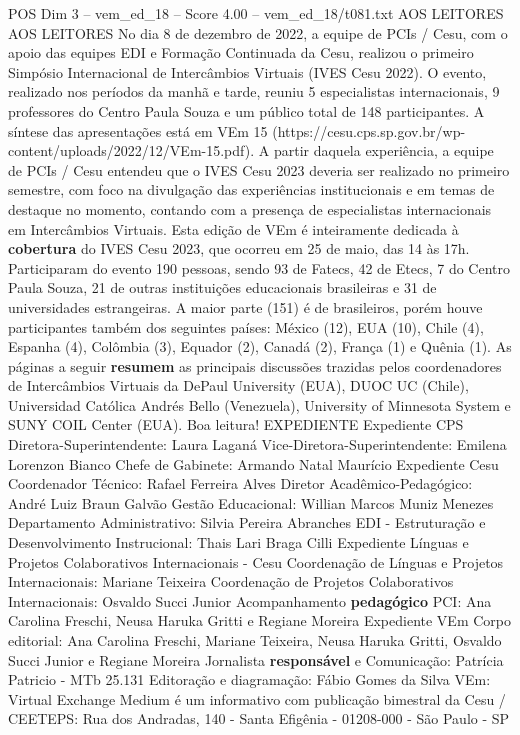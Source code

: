 \begin{textsample}{POS Dim 3 – vem\_ed\_18 – Score 4.00 – vem\_ed\_18/t081.txt}  \label{ex:f3_pos_134}
AOS LEITORES AOS LEITORES No dia 8 de dezembro de 2022, a equipe de PCIs / Cesu, com o apoio das equipes EDI e Formação Continuada da Cesu, realizou o primeiro Simpósio Internacional de Intercâmbios Virtuais (IVES Cesu 2022).
O evento, realizado nos períodos da manhã e tarde, reuniu 5 especialistas internacionais, 9 professores do Centro Paula Souza e um público total de 148 participantes.
A síntese das apresentações está em VEm 15 (https://cesu.cps.sp.gov.br/wp-content/uploads/2022/12/VEm-15.pdf).
A partir daquela experiência, a equipe de PCIs / Cesu entendeu que o IVES Cesu 2023 deveria ser realizado no primeiro semestre, com foco na divulgação das experiências institucionais e em temas de destaque no momento, contando com a presença de especialistas internacionais em Intercâmbios Virtuais.
Esta edição de VEm é inteiramente dedicada à \textbf{cobertura} do IVES Cesu 2023, que ocorreu em 25 de maio, das 14 às 17h.
Participaram do evento 190 pessoas, sendo 93 de Fatecs, 42 de Etecs, 7 do Centro Paula Souza, 21 de outras instituições educacionais brasileiras e 31 de universidades estrangeiras.
A maior parte (151) é de brasileiros, porém houve participantes também dos seguintes países: México (12), EUA (10), Chile (4), Espanha (4), Colômbia (3), Equador (2), Canadá (2), França (1) e Quênia (1).
As páginas a seguir \textbf{resumem} as principais discussões trazidas pelos coordenadores de Intercâmbios Virtuais da DePaul University (EUA), DUOC UC (Chile), Universidad Católica Andrés Bello (Venezuela), University of Minnesota System e SUNY COIL Center (EUA).
Boa leitura!
EXPEDIENTE Expediente CPS Diretora-Superintendente: Laura Laganá Vice-Diretora-Superintendente: Emilena Lorenzon Bianco Chefe de Gabinete: Armando Natal Maurício Expediente Cesu Coordenador Técnico: Rafael Ferreira Alves Diretor Acadêmico-Pedagógico: André Luiz Braun Galvão Gestão Educacional: Willian Marcos Muniz Menezes Departamento Administrativo: Silvia Pereira Abranches EDI - Estruturação e Desenvolvimento Instrucional: Thais Lari Braga Cilli Expediente Línguas e Projetos Colaborativos Internacionais - Cesu Coordenação de Línguas e Projetos Internacionais: Mariane Teixeira Coordenação de Projetos Colaborativos Internacionais: Osvaldo Succi Junior Acompanhamento \textbf{pedagógico} PCI: Ana Carolina Freschi, Neusa Haruka Gritti e Regiane Moreira Expediente VEm Corpo editorial: Ana Carolina Freschi, Mariane Teixeira, Neusa Haruka Gritti, Osvaldo Succi Junior e Regiane Moreira Jornalista \textbf{responsável} e Comunicação: Patrícia Patricio - MTb 25.131 Editoração e diagramação: Fábio Gomes da Silva VEm: Virtual Exchange Medium é um informativo com publicação bimestral da Cesu / CEETEPS: Rua dos Andradas, 140 - Santa Efigênia - 01208-000 - São Paulo - SP

\end{textsample}
